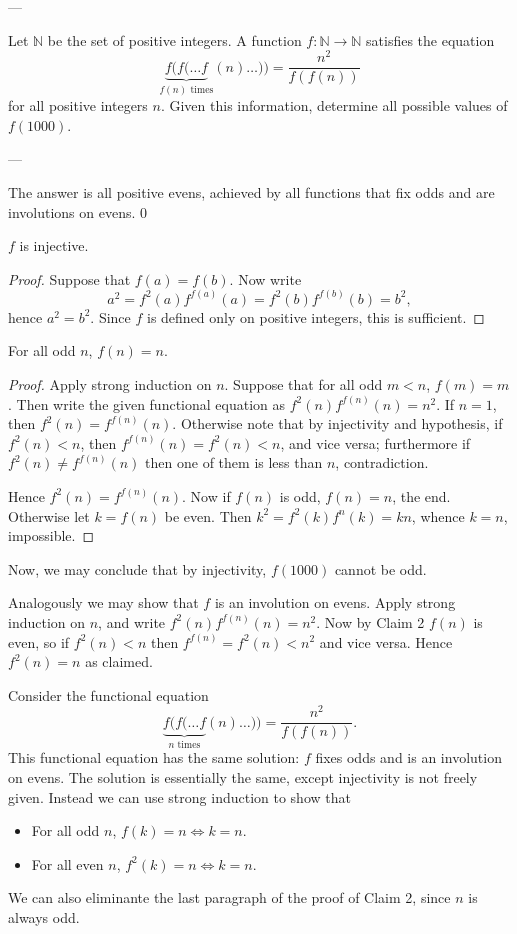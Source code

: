
---

Let $\mathbb N$ be the set of positive integers. A function $f:\mathbb N\to\mathbb N$ satisfies the equation \[\underbrace{f(f(\ldots f}_{f(n)\text{ times}}(n)\ldots))=\frac{n^2}{f(f(n))}\]
for all positive integers $n$. Given this information, determine all possible values of $f(1000)$.

---

The answer is all positive evens, achieved by all functions that fix odds and are involutions on evens.
\setcounter{iclaim}0
\begin{iclaim}
    $f$ is injective.
\end{iclaim}
\begin{proof}
    Suppose that $f(a)=f(b)$. Now write \[a^2=f^2(a)f^{f(a)}(a)=f^2(b)f^{f(b)}(b)=b^2,\]
    hence $a^2=b^2$. Since $f$ is defined only on positive integers, this is sufficient.
\end{proof}
\begin{iclaim}
    For all odd $n$, $f(n)=n$.
\end{iclaim}
\begin{proof}
    Apply strong induction on $n$. Suppose that for all odd $m<n$, $f(m)=m$. Then write the given functional equation as $f^2(n)f^{f(n)}(n)=n^2$. If $n=1$, then $f^2(n)=f^{f(n)}(n)$. Otherwise note that by injectivity and hypothesis, if $f^2(n)<n$, then $f^{f(n)}(n)=f^2(n)<n$, and vice versa; furthermore if $f^2(n)\ne f^{f(n)}(n)$ then one of them is less than $n$, contradiction.

    Hence $f^2(n)=f^{f(n)}(n)$. Now if $f(n)$ is odd, $f(n)=n$, the end. Otherwise let $k=f(n)$ be even. Then $k^2=f^2(k)f^n(k)=kn$, whence $k=n$, impossible.
\end{proof}

Now, we may conclude that by injectivity, $f(1000)$ cannot be odd.
\begin{boxremark}
    Analogously we may show that $f$ is an involution on evens. Apply strong induction on $n$, and write $f^2(n)f^{f(n)}(n)=n^2$. Now by Claim 2 $f(n)$ is even, so if $f^2(n)<n$ then $f^{f(n)}=f^2(n)<n^2$ and vice versa. Hence $f^2(n)=n$ as claimed.
\end{boxremark}
\begin{boxremark}
    Consider the functional equation \[\underbrace{f(f(\ldots f}_{n\text{ times}}(n)\ldots))=\frac{n^2}{f(f(n))}.\]
    This functional equation has the same solution: $f$ fixes odds and is an involution on evens. The solution is essentially the same, except injectivity is not freely given. Instead we can use strong induction to show that
    \begin{itemize}
        \item For all odd $n$, $f(k)=n\iff k=n$.
        \item For all even $n$, $f^2(k)=n\iff k=n$.
    \end{itemize}
    We can also eliminante the last paragraph of the proof of Claim 2, since $n$ is always odd.
\end{boxremark}

